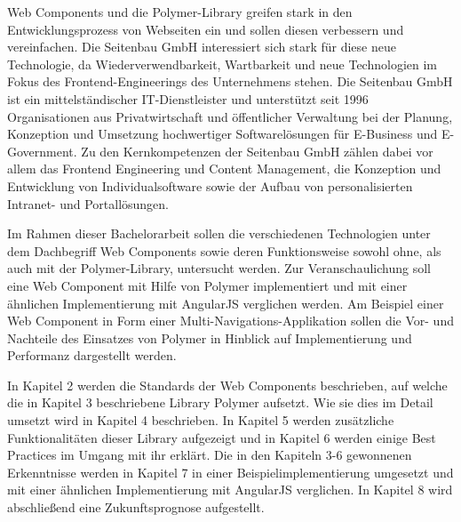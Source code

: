 Web Components und die Polymer-Library greifen stark in den Entwicklungsprozess von Webseiten ein und sollen diesen verbessern und vereinfachen. Die Seitenbau GmbH interessiert sich stark für diese neue Technologie, da Wiederverwendbarkeit, Wartbarkeit und neue Technologien im Fokus des Frontend-Engineerings des Unternehmens stehen.
Die Seitenbau GmbH ist ein mittelständischer IT-Dienstleister und unterstützt seit 1996 Organisationen aus Privatwirtschaft und öffentlicher Verwaltung bei der Planung, Konzeption und Umsetzung hochwertiger Softwarelösungen für E-Business und E-Government. Zu den Kernkompetenzen der Seitenbau GmbH zählen dabei vor allem das Frontend Engineering und Content Management, die Konzeption und Entwicklung von Individualsoftware sowie der Aufbau von personalisierten Intranet- und Portallösungen.

Im Rahmen dieser Bachelorarbeit sollen die verschiedenen Technologien unter dem Dachbegriff Web Components sowie deren Funktionsweise sowohl ohne, als auch mit der Polymer-Library, untersucht werden. Zur Veranschaulichung soll eine Web Component mit Hilfe von Polymer implementiert und mit einer ähnlichen Implementierung mit AngularJS verglichen werden. Am Beispiel einer Web Component in Form einer Multi-Navigations-Applikation sollen die Vor- und Nachteile des Einsatzes von Polymer in Hinblick auf Implementierung und Performanz dargestellt werden.

In Kapitel 2 werden die Standards der Web Components beschrieben, auf welche die in Kapitel 3 beschriebene Library Polymer aufsetzt. Wie sie dies im Detail umsetzt wird in Kapitel 4 beschrieben. In Kapitel 5 werden zusätzliche Funktionalitäten dieser Library aufgezeigt und in Kapitel 6 werden einige Best Practices im Umgang mit ihr erklärt. Die in den Kapiteln 3-6 gewonnenen Erkenntnisse werden in Kapitel 7 in einer Beispielimplementierung umgesetzt und mit einer ähnlichen Implementierung mit AngularJS verglichen. In Kapitel 8 wird abschließend eine Zukunftsprognose aufgestellt.
